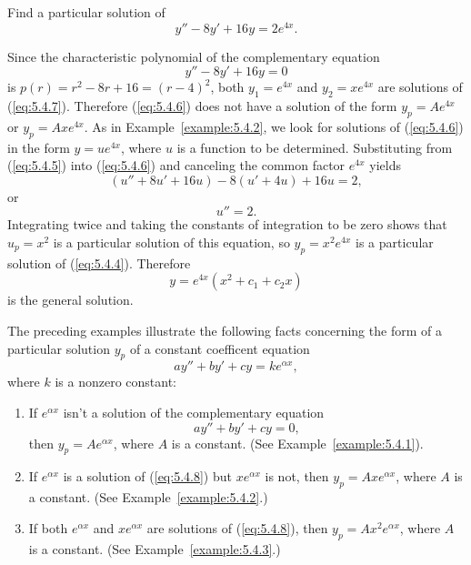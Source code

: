 \documentclass{ximera}
\begin{document}
\begin{example}\label{example:5.4.3}
Find a particular solution of
\begin{equation} \label{eq:5.4.6}
y''-8y'+16y=2e^{4x}.
\end{equation}

\begin{explanation}
Since the characteristic polynomial of the complementary equation
\begin{equation} \label{eq:5.4.7}
y''-8y'+16y=0
\end{equation}
is $p(r)=r^2-8r+16=(r-4)^2$, both $y_1=e^{4x}$ and $y_2=xe^{4x}$ are
solutions of (\ref{eq:5.4.7}). Therefore (\ref{eq:5.4.6}) does not have a
solution of the form $y_p=Ae^{4x}$ or $y_p=Axe^{4x}$. As in
Example~\ref{example:5.4.2}, we look for solutions of (\ref{eq:5.4.6}) in the
form $y=ue^{4x}$, where $u$ is a function to be determined.
Substituting from (\ref{eq:5.4.5}) into (\ref{eq:5.4.6}) and canceling the
common factor $e^{4x}$ yields
$$
(u''+8u'+16u)-8(u'+4u)+16u=2,
$$
or
$$
u''=2.
$$
Integrating twice and taking the constants of integration to be zero
shows that $u_p=x^2$ is a particular solution of this equation, so
$y_p=x^2e^{4x}$ is a particular solution of (\ref{eq:5.4.4}). Therefore
$$
y=e^{4x}(x^2+c_1+c_2x)
$$
is the general solution.
\end{explanation}
\end{example}

The preceding examples illustrate the following facts concerning
the form of a particular solution $y_p$
of a constant coefficent equation
$$
ay''+by'+cy=ke^{\alpha x},
$$
where $k$ is a nonzero constant:

\begin{enumerate}
\item\label{item:ypa} %
If $e^{\alpha x}$ isn't  a solution of the complementary
equation
\begin{equation} \label{eq:5.4.8}
ay''+by'+cy=0,
\end{equation}
then  $y_p=Ae^{\alpha x}$, where $A$ is a constant. (See
Example~\ref{example:5.4.1}).
\item \label{item:ypb} %
If $e^{\alpha x}$ is a solution of (\ref{eq:5.4.8}) but $xe^{\alpha x}$
is not, then  $y_p=Axe^{\alpha x}$,  where $A$ is a constant.
(See Example~\ref{example:5.4.2}.)
\item \label{item:ypc}%
If both $e^{\alpha x}$ and $xe^{\alpha x}$ are solutions of (\ref{eq:5.4.8}),
then  $y_p=Ax^2e^{\alpha x}$,  where $A$ is a constant.
(See Example~\ref{example:5.4.3}.)
\end{enumerate}
\end{document}
